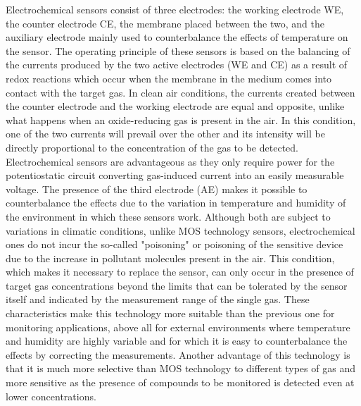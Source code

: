 \documentclass[10pt]{../imeko_acta}
\begin{document}
Electrochemical sensors consist of three electrodes: the working electrode WE, the counter electrode CE, the membrane placed between the two, and the auxiliary electrode mainly used to counterbalance the effects of temperature on the sensor. The operating principle of these sensors is based on the balancing of the currents produced by the two active electrodes (WE and CE) as a result of redox reactions which occur when the membrane in the medium comes into contact with the target gas. In clean air conditions, the currents created between the counter electrode and the working electrode are equal and opposite, unlike what happens when an oxide-reducing gas is present in the air. In this condition, one of the two currents will prevail over the other and its intensity will be directly proportional to the concentration of the gas to be detected. Electrochemical sensors are advantageous as they only require power for the potentiostatic circuit converting gas-induced current into an easily measurable voltage. The presence of the third electrode (AE) makes it possible to counterbalance the effects due to the variation in temperature and humidity of the environment in which these sensors work. Although both are subject to variations in climatic conditions, unlike MOS technology sensors, electrochemical ones do not incur the so-called "poisoning" or poisoning of the sensitive device due to the increase in pollutant molecules present in the air. This condition, which makes it necessary to replace the sensor, can only occur in the presence of target gas concentrations beyond the limits that can be tolerated by the sensor itself and indicated by the measurement range of the single gas. These characteristics make this technology more suitable than the previous one for monitoring applications, above all for external environments where temperature and humidity are highly variable and for which it is easy to counterbalance the effects by correcting the measurements. Another advantage of this technology is that it is much more selective than MOS technology to different types of gas and more sensitive as the presence of compounds to be monitored is detected even at lower concentrations.
\end{document}
